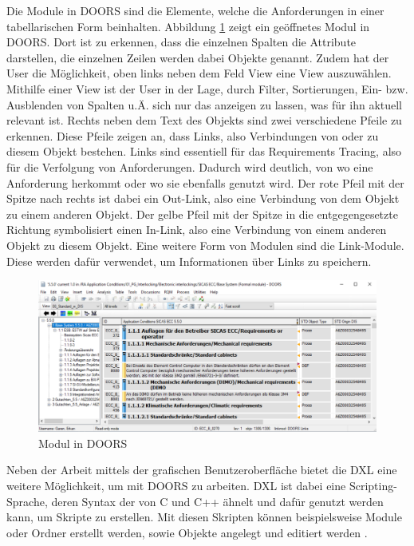 Die Module in \acs{DOORS} sind die Elemente, welche die Anforderungen in einer tabellarischen Form beinhalten. Abbildung \ref*{fig:Doors Modul} zeigt ein geöffnetes Modul in \acs{DOORS}. Dort ist zu erkennen,
dass die einzelnen Spalten die Attribute darstellen, die einzelnen Zeilen werden dabei Objekte genannt. Zudem hat der User die Möglichkeit, oben links neben dem Feld \glqq View\grqq{} eine View auszuwählen. 
Mithilfe einer View ist der User in der Lage, durch Filter, Sortierungen, Ein- bzw. Ausblenden von Spalten u.Ä. sich nur das anzeigen zu lassen, was für ihn aktuell relevant ist. Rechts neben dem Text des 
Objekts sind zwei verschiedene Pfeile zu erkennen. Diese Pfeile zeigen an, dass Links, also Verbindungen von oder zu diesem Objekt bestehen. Links sind essentiell für das Requirements Tracing, also für die
Verfolgung von Anforderungen. Dadurch wird deutlich, von wo eine Anforderung herkommt oder wo sie ebenfalls genutzt wird. Der rote Pfeil mit der Spitze nach rechts ist dabei ein Out-Link, also eine
Verbindung von dem Objekt zu einem anderen Objekt. Der gelbe Pfeil mit der Spitze in die entgegengesetzte Richtung symbolisiert einen In-Link, also eine Verbindung von einem anderen Objekt zu diesem 
Objekt. Eine weitere Form von Modulen sind die Link-Module. Diese werden dafür verwendet, um Informationen über Links zu speichern. 

\begin{figure}[H]
    \centering
    \includegraphics[width = \textwidth]{abbildungen/Modul in Doors.PNG}
    \caption{Modul in \acs{DOORS}}
    \label{fig:Doors Modul}
\end{figure}

Neben der Arbeit mittels der grafischen Benutzeroberfläche bietet die \ac*{DXL} eine weitere Möglichkeit, um mit \acs{DOORS} zu arbeiten. \acs{DXL} ist dabei eine Scripting-Sprache, deren
Syntax der von C und C++ ähnelt und dafür genutzt werden kann, um Skripte zu erstellen. Mit diesen Skripten können beispielsweise Module oder Ordner erstellt werden, sowie Objekte angelegt und 
editiert werden \cite[]{q7}. 